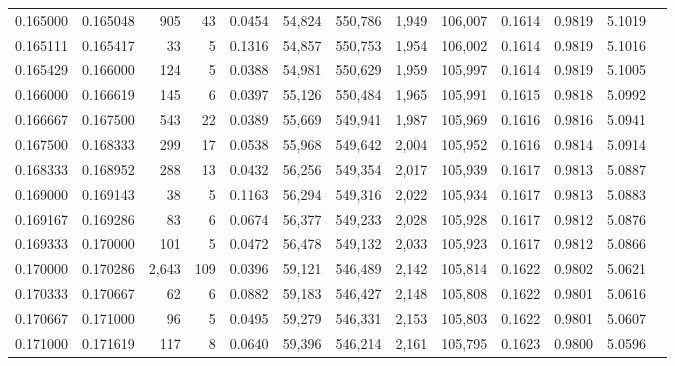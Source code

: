 \begin{tabular}{rrrrrrrrrrrrr}
0.165000 & 0.165048 &   905 &  43 &                                     0.0454 &  54,824 & 550,786 &   1,949 & 106,007 & 0.1614 & 0.9819 & 5.1019 \\
0.165111 & 0.165417 &    33 &   5 &                                     0.1316 &  54,857 & 550,753 &   1,954 & 106,002 & 0.1614 & 0.9819 & 5.1016 \\
0.165429 & 0.166000 &   124 &   5 &                                     0.0388 &  54,981 & 550,629 &   1,959 & 105,997 & 0.1614 & 0.9819 & 5.1005 \\
0.166000 & 0.166619 &   145 &   6 &                                     0.0397 &  55,126 & 550,484 &   1,965 & 105,991 & 0.1615 & 0.9818 & 5.0992 \\
0.166667 & 0.167500 &   543 &  22 &                                     0.0389 &  55,669 & 549,941 &   1,987 & 105,969 & 0.1616 & 0.9816 & 5.0941 \\
0.167500 & 0.168333 &   299 &  17 &                                     0.0538 &  55,968 & 549,642 &   2,004 & 105,952 & 0.1616 & 0.9814 & 5.0914 \\
0.168333 & 0.168952 &   288 &  13 &                                     0.0432 &  56,256 & 549,354 &   2,017 & 105,939 & 0.1617 & 0.9813 & 5.0887 \\
0.169000 & 0.169143 &    38 &   5 &                                     0.1163 &  56,294 & 549,316 &   2,022 & 105,934 & 0.1617 & 0.9813 & 5.0883 \\
0.169167 & 0.169286 &    83 &   6 &                                     0.0674 &  56,377 & 549,233 &   2,028 & 105,928 & 0.1617 & 0.9812 & 5.0876 \\
0.169333 & 0.170000 &   101 &   5 &                                     0.0472 &  56,478 & 549,132 &   2,033 & 105,923 & 0.1617 & 0.9812 & 5.0866 \\
0.170000 & 0.170286 & 2,643 & 109 &                                     0.0396 &  59,121 & 546,489 &   2,142 & 105,814 & 0.1622 & 0.9802 & 5.0621 \\
0.170333 & 0.170667 &    62 &   6 &                                     0.0882 &  59,183 & 546,427 &   2,148 & 105,808 & 0.1622 & 0.9801 & 5.0616 \\
0.170667 & 0.171000 &    96 &   5 &                                     0.0495 &  59,279 & 546,331 &   2,153 & 105,803 & 0.1622 & 0.9801 & 5.0607 \\
0.171000 & 0.171619 &   117 &   8 &                                     0.0640 &  59,396 & 546,214 &   2,161 & 105,795 & 0.1623 & 0.9800 & 5.0596 \\

\end{tabular}
